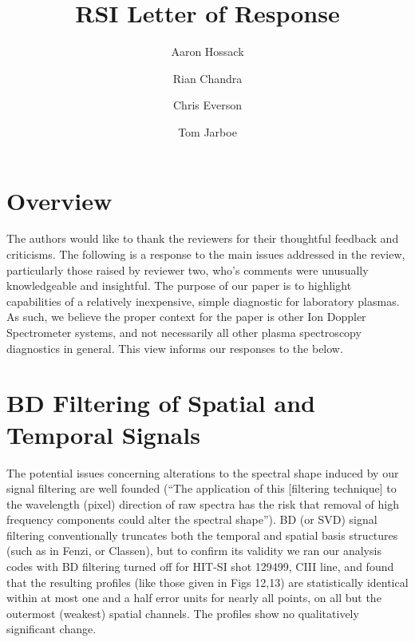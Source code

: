 \documentclass[]{AIAA}
\begin{document}
\title{RSI Letter of Response}
\author{Aaron Hossack}
\author{Rian Chandra}
\author{Chris Everson}
\author{Tom Jarboe}

\maketitle
\section{Overview}
\hspace{4ex}The authors would like to thank the reviewers for their thoughtful feedback and criticisms. The following is a response to the main issues addressed in the review, particularly those raised by reviewer two, who's comments were unusually knowledgeable and insightful. The purpose of our paper is to highlight capabilities of a relatively inexpensive, simple diagnostic for laboratory plasmas. As such, we believe the proper context for the paper is other Ion Doppler Spectrometer systems, and not necessarily all other plasma spectroscopy diagnostics in general. This view informs our responses to the below.

\section{BD Filtering of Spatial and Temporal Signals}
\hspace{4ex}The potential issues concerning alterations to the spectral shape induced by our signal filtering are well founded (``The application of this [filtering technique] to the wavelength (pixel) direction of raw spectra has the risk that removal of high frequency components could alter the spectral shape''). BD (or SVD) signal filtering conventionally truncates both the temporal and spatial basis structures (such as in Fenzi\cite{fenzi20012d}, or Classen\cite{Classen2010}), but to confirm its validity we ran our analysis codes with BD filtering turned off for HIT-SI shot 129499, CIII line, and found that the resulting profiles (like those given in Figs 12,13) are statistically identical within at most one and a half error units for nearly all points, on all but the outermost (weakest) spatial channels. The profiles show no qualitatively significant change.
\end{document}
